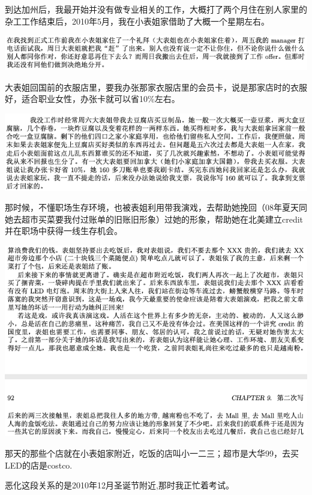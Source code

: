 \documentclass[9pt, b5paper]{article}
\begin{document}
到达加州后，我最开始并没有做专业相关的工作，大概打了两个月住在别人家里的杂工工作结束后，2010年5月，我在小表姐家借助了大概一个星期左右。

\begin{center}
\includegraphics[width=.9\linewidth]{./pic/p1p47-3.png}
\end{center}

大表姐回国前的衣服店里，要我办张那家衣服店里的会员卡，说是那家店时的衣服好，适合职业女性，办张卡就可以省10\%左右。

\begin{center}
\includegraphics[width=.9\linewidth]{./pic/p1p48-3.png}
\end{center}

那时候，不懂职场生存环境，也被表姐利用带我演戏，去帮助她挽回（08年夏天同她去超市买菜要我付过账单的旧账旧形象）过她的形象，帮助她在北美建立credit并在职场中获得一线生存机会。 

\begin{center}
\includegraphics[width=.9\linewidth]{./pic/p1p92.png}
\end{center}

那天的那些个店就在小表姐家附近，吃饭的店叫小一二三；超市是大华99，去买LED的店是costco.

恶化这段关系的是2010年12月圣诞节附近,那时我正忙着考试。 
\end{document}
